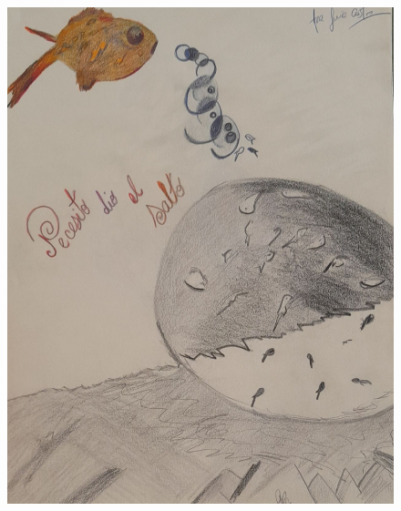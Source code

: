\documentclass[12pt, a4paper, twoside]{book} %
\begin{document}
\begin{figure}[H]
	\centering
	\includegraphics[width=\textwidth]{1f81324df70a75.jpg}
\end{figure}
\end{document}
